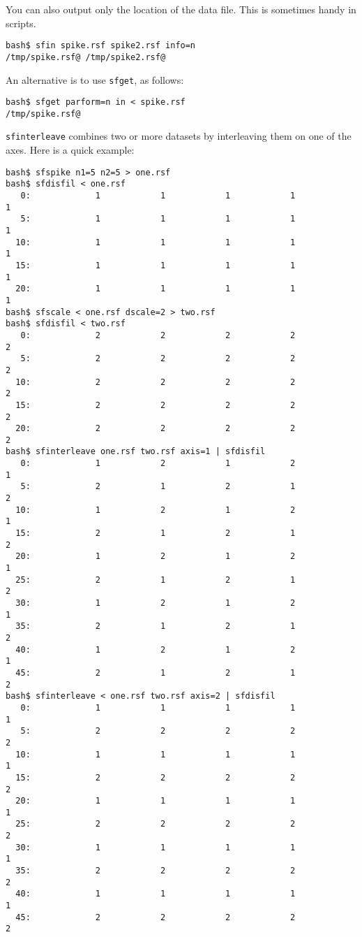 You can also output only the location of the data file. This is
sometimes handy in scripts.
\begin{verbatim}
bash$ sfin spike.rsf spike2.rsf info=n
/tmp/spike.rsf@ /tmp/spike2.rsf@
\end{verbatim}
An alternative is to use \texttt{sfget}, as follows:
\begin{verbatim}
bash$ sfget parform=n in < spike.rsf
/tmp/spike.rsf@
\end{verbatim}

\noindent\doublebox{\parbox{\textwidth}{
    
  }}

\texttt{sfinterleave} combines two or more datasets by interleaving them on one
of the axes. Here is a quick example:
\begin{verbatim}
bash$ sfspike n1=5 n2=5 > one.rsf
bash$ sfdisfil < one.rsf
   0:             1            1            1            1            1
   5:             1            1            1            1            1
  10:             1            1            1            1            1
  15:             1            1            1            1            1
  20:             1            1            1            1            1
bash$ sfscale < one.rsf dscale=2 > two.rsf
bash$ sfdisfil < two.rsf
   0:             2            2            2            2            2
   5:             2            2            2            2            2
  10:             2            2            2            2            2
  15:             2            2            2            2            2
  20:             2            2            2            2            2
bash$ sfinterleave one.rsf two.rsf axis=1 | sfdisfil
   0:             1            2            1            2            1
   5:             2            1            2            1            2
  10:             1            2            1            2            1
  15:             2            1            2            1            2
  20:             1            2            1            2            1
  25:             2            1            2            1            2
  30:             1            2            1            2            1
  35:             2            1            2            1            2
  40:             1            2            1            2            1
  45:             2            1            2            1            2
bash$ sfinterleave < one.rsf two.rsf axis=2 | sfdisfil
   0:             1            1            1            1            1
   5:             2            2            2            2            2
  10:             1            1            1            1            1
  15:             2            2            2            2            2
  20:             1            1            1            1            1
  25:             2            2            2            2            2
  30:             1            1            1            1            1
  35:             2            2            2            2            2
  40:             1            1            1            1            1
  45:             2            2            2            2            2
\end{verbatim}

